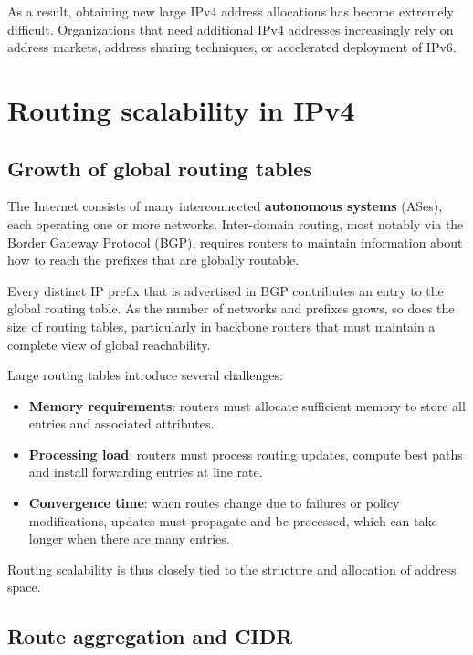 As a result, obtaining new large IPv4 address allocations has become extremely difficult. Organizations that need additional IPv4 addresses increasingly rely on address markets, address sharing techniques, or accelerated deployment of IPv6.

\begin{center}
\end{center}

\section{Routing scalability in IPv4}

\subsection{Growth of global routing tables}

The Internet consists of many interconnected \textbf{autonomous systems} (ASes), each operating one or more networks. Inter-domain routing, most notably via the Border Gateway Protocol (BGP), requires routers to maintain information about how to reach the prefixes that are globally routable.

Every distinct IP prefix that is advertised in BGP contributes an entry to the global routing table. As the number of networks and prefixes grows, so does the size of routing tables, particularly in backbone routers that must maintain a complete view of global reachability.

Large routing tables introduce several challenges:

\begin{itemize}
\item \textbf{Memory requirements}: routers must allocate sufficient memory to store all entries and associated attributes.
\item \textbf{Processing load}: routers must process routing updates, compute best paths and install forwarding entries at line rate.
\item \textbf{Convergence time}: when routes change due to failures or policy modifications, updates must propagate and be processed, which can take longer when there are many entries.
\end{itemize}

Routing scalability is thus closely tied to the structure and allocation of address space.

\subsection{Route aggregation and CIDR}


